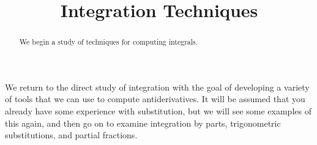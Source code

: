 \documentclass{ximera}
\title{Integration Techniques}
\begin{document}
\begin{abstract}
We begin a study of techniques for computing integrals.
\end{abstract}
\maketitle

We return to the direct study of integration with the goal of developing a variety of tools that we can use to compute antiderivatives. It will be assumed that you already have some experience with substitution, but we will see some examples of this again, and then go on to examine integration by parts, trigonometric substitutions, and partial fractions.
\end{document}
